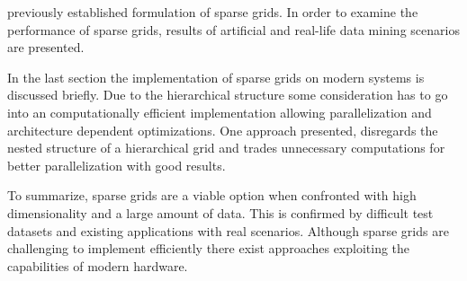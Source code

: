 \documentclass[a4paper]{scrartcl}
\begin{document}
previously established formulation of sparse grids. In order to examine
the performance of sparse grids, results of artificial and
real-life data mining scenarios are presented.
\par
In the last section the implementation of sparse grids on modern
systems is discussed briefly. Due to the hierarchical structure some
consideration has to go into an computationally efficient
implementation allowing
parallelization and architecture dependent optimizations.
One approach presented, disregards the nested structure of a hierarchical grid
and trades unnecessary computations for better parallelization with good
results.
\par
To summarize, sparse grids are a viable option when confronted with
high dimensionality and a large amount of data. This is confirmed by
difficult test datasets and existing applications with real scenarios. Although
sparse grids are challenging to implement efficiently there exist approaches
exploiting the capabilities of modern hardware.
\end{document}
